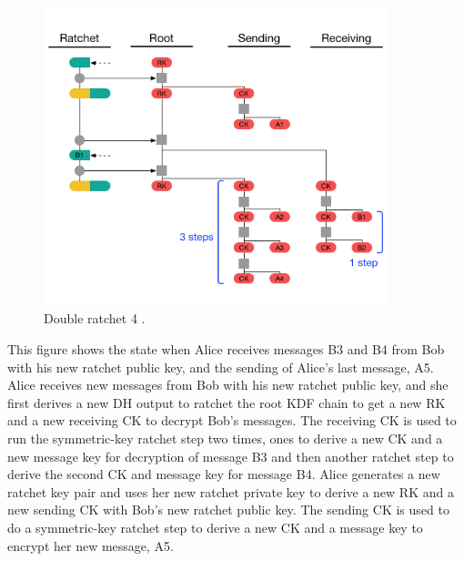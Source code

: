 \begin{figure}[H]
	\centering
	\includegraphics[width=10cm]{figures/doubleratchet4.png}
	\caption{Double ratchet 4 \cite{doubleratchet}.}
	\label{fig:doubleratchet4}
\end{figure}

This figure shows the state when Alice receives messages B3 and B4
from Bob with his new ratchet public key, and the sending of Alice’s last
message, A5. Alice receives new messages from Bob with his new ratchet
public key, and she first derives a new DH output to ratchet the root KDF
chain to get a new RK and a new receiving CK to decrypt Bob’s messages.
The receiving CK is used to run the symmetric-key ratchet step two times,
ones to derive a new CK and a new message key for decryption of message
B3 and then another ratchet step to derive the second CK and message key
for message B4. Alice generates a new ratchet key pair and uses her new
ratchet private key to derive a new RK and a new sending CK with Bob’s
new ratchet public key. The sending CK is used to do a symmetric-key
ratchet step to derive a new CK and a message key to encrypt her new
message, A5.

